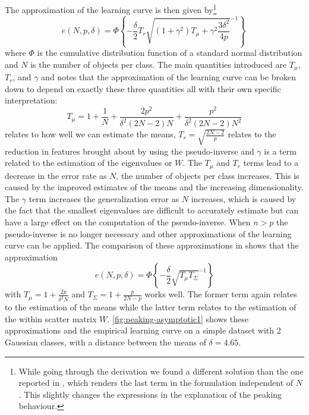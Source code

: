 \documentclass[runningheads,a4paper]{llncs}\usepackage[]{graphicx}\usepackage[]{color}
\begin{document}
The approximation of the learning curve is then given by\footnote{While going through the derivation we found a different solution than the one reported in \cite{Raudys1998}, which renders the last term in the formulation independent of $N$. This slightly changes the expressions in the explanation of the peaking behaviour.}
$$e(N,p,\delta) = \Phi \left\{ - \frac{\delta}{2} T_r \sqrt{(1+\gamma^2)T_\mu+\gamma^2 \frac{3 \delta^2}{4 p}}^{-1}\right\} \,$$
where $\Phi$ is the cumulative distribution function of a standard normal distribution and $N$ is the number of objects per class.  The main quantities introduced are $T_\mu$, $T_r$, and $\gamma$ and \cite{Raudys1998} notes that the approximation of the learning curve can be broken down to depend on exactly these three quantities all with their own specific interpretation:
$$T_\mu=1+ \frac{1}{N} + \frac{2 p^2}{\delta^2 (2N-2) N}+\frac{p^2}{\delta^2 (2N-2) N^2}$$
relates to how well we can estimate the means, $T_r=\sqrt{\frac{2 N-2}{p}}$ relates to the reduction in features brought about by using the pseudo-inverse and $\gamma$ is a term related to the estimation of the eigenvalues or $W$.  The $T_\mu$ and $T_r$ terms lead to a decrease in the error rate as $N$, the number of objects per class increases. This is caused by the improved estimates of the means and the increasing dimensionality. The $\gamma$ term increases the generalization error as $N$ increases, which is caused by the fact that the smallest eigenvalues are difficult to accurately estimate but can have a large effect on the computation of the pseudo-inverse.  When $n>p$ the pseudo-inverse is no longer necessary and other approximations of the learning curve can be applied. The comparison of these approximations in \cite{Wyman1990} shows that the approximation
$$
e(N,p,\delta) = \Phi \left\{ - \frac{\delta}{2}  \sqrt{T_\mu T_\Sigma}^{-1}\right\} 
$$
with $T_\mu=1+\frac{2 p}{\delta^2 N}$ and $T_\Sigma=1+\frac{p}{2 N - p}$ works well. The former term again relates to the estimation of the means while the latter term relates to the estimation of the within scatter matrix $W$.  \cref{fig:peaking-asymptotic1} shows these approximations and the empirical learning curve on a simple dataset with 2 Gaussian classes, with a distance between the means of $\delta=4.65$.
\end{document}
